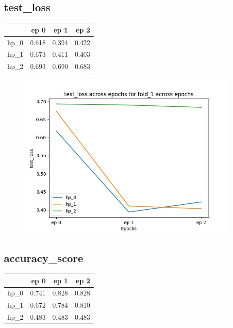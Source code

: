 \documentclass{article}
\begin{document}
\subsection{test\_loss}
\begin{tabular}{lrrr}
\toprule
{} &   ep 0 &   ep 1 &   ep 2 \\
\midrule
hp\_0 &  0.618 &  0.394 &  0.422 \\
hp\_1 &  0.673 &  0.411 &  0.403 \\
hp\_2 &  0.693 &  0.690 &  0.683 \\
\bottomrule
\end{tabular}

\begin{figure}[H]
\includegraphics[scale = 0.75]{fold_1/test_loss}
\end{figure}
\subsection{accuracy\_score}
\begin{tabular}{lrrr}
\toprule
{} &   ep 0 &   ep 1 &   ep 2 \\
\midrule
hp\_0 &  0.741 &  0.828 &  0.828 \\
hp\_1 &  0.672 &  0.784 &  0.810 \\
hp\_2 &  0.483 &  0.483 &  0.483 \\
\bottomrule
\end{tabular}
\end{document}
